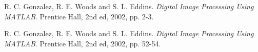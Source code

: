 

\begin{thebibliography}{9}
R. C. Gonzalez, R. E. Woods and S. L. Eddins. \textit{Digital Image Processing Using MATLAB}. Prentice Hall, 2nd ed, 2002, pp. 2-3.

R. C. Gonzalez, R. E. Woods and S. L. Eddins. \textit{Digital Image Processing Using MATLAB}. Prentice Hall, 2nd ed, 2002, pp. 52-54.
\end{thebibliography}


